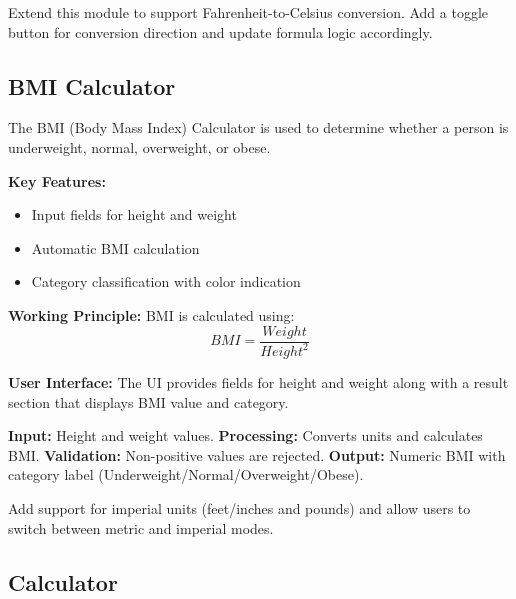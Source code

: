 \documentclass{article}
\begin{document}
\begin{reportbox}
Extend this module to support Fahrenheit-to-Celsius conversion. Add a toggle button for conversion direction and update formula logic accordingly.
\end{reportbox}

\subsection{BMI Calculator}

The BMI (Body Mass Index) Calculator is used to determine whether a person is underweight, normal, overweight, or obese.

\textbf{Key Features:}
\begin{itemize}
\item Input fields for height and weight
\item Automatic BMI calculation
\item Category classification with color indication
\end{itemize}

\textbf{Working Principle:}
BMI is calculated using:
\[
BMI = \frac{Weight}{Height^2}
\]

\textbf{User Interface:}
The UI provides fields for height and weight along with a result section that displays BMI value and category.

\begin{featurebox}
\textbf{Input:} Height and weight values.\newline
\textbf{Processing:} Converts units and calculates BMI.\newline
\textbf{Validation:} Non-positive values are rejected.\newline
\textbf{Output:} Numeric BMI with category label (Underweight/Normal/Overweight/Obese).
\end{featurebox}

\begin{reportbox}
Add support for imperial units (feet/inches and pounds) and allow users to switch between metric and imperial modes.
\end{reportbox}

\subsection{Calculator}
\end{document}
